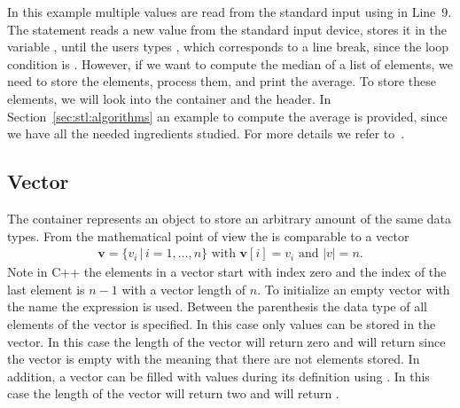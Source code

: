 In this example multiple values are read from the standard input using  in Line~9. The  statement reads a new value from the standard input device, stores it in the variable , until the users types \cpp{\\n}, which corresponds to a line break, since the loop condition is . However, if we want to compute the median of a list of elements, we need to store the elements, process them, and print the average. To store these elements, we will look into the  container and the  header. In Section~\ref{sec:stl:algorithms} an example to compute the average is provided, since we have all the needed ingredients studied. For more details we refer to~\cite[Chapter~3]{andrew2000accelerated}.  



\subsection{Vector}
The container  represents an object to store an arbitrary amount of the same data types. From the mathematical point of view the  is comparable to a vector
\begin{align}
\mathbf{v} = \{v_i \,\vert\, i=1,\ldots,n \} \text{ with } \mathbf{v}[i] = v_i \text{ and }  \vert v\vert = n\text{.} 
\end{align}
Note in C++ the elements in a vector start with index zero and the index of the last element is $n-1$ with a vector length of $n$. To initialize an empty vector with the name  the expression  is used. Between the parenthesis the data type of all elements of the vector is specified. In this case only  values can be stored in the vector. In this case the length of the vector  will return zero and  will return  since the vector is empty with the meaning that there are not elements stored. In addition, a vector can be filled with values during its definition using . In this case the length of the vector  will return two and  will return .\\

